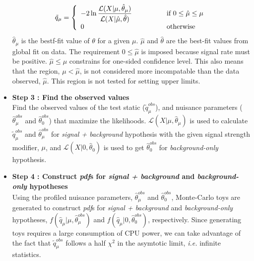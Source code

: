 \begin{itemize}
\begin{eqnarray} 
\tilde{q}_\mu 
= 
\left\{ \begin{array}{l l}
\displaystyle
-2 \ln \frac{\mathcal{L} ( X | \mu, \hat{\theta}_\mu)}
            {\mathcal{L} ( X | \hat{\mu}, \hat{\theta})}  
            & \quad \quad \quad \quad \textrm{if } 0 \le \hat{\mu} \le \mu \\
0           & \quad \quad \quad \quad \textrm{otherwise}
\end{array} \right.
\end{eqnarray}  
$\hat{\theta}_\mu$ is the bestf-fit value of $\theta$ for a given $\mu$. 
$\hat{\mu}$ and $\hat{\theta}$ are the best-fit values from global fit on data. 
The requirement $0 \le \hat{\mu}$ is imposed because signal rate must be positive. 
$\hat{\mu} \le \mu$ constrains for one-sided confidence level. 
This also means that the region, $\mu < \hat{\mu}$, is not considered  
more incompatable than the data observed, $\hat{\mu}$. This region 
is not tested for setting upper limits.
%
\item{\textbf{Step 3 : Find the observed values}}  \\
Find the observed values of the test static ($\tilde{q}_\mu^{obs}$), and 
nuisance parameters ($\hat{\theta}_\mu^{obs}$ and $\hat{\theta}_0^{obs}$)
that maximize the likelihoods. 
$\mathcal{L} ( X | \mu, \hat{\theta}_\mu)$ is used to calculate
$\tilde{q}_\mu^{obs}$ and $\hat{\theta}_\mu^{obs}$ for \textit{signal + background}
hypothesis with the given signal strength modifier, $\mu$,
and $\mathcal{L} ( X | 0, \hat{\theta}_0)$ is used to get $\hat{\theta}_0^{obs}$
for \textit{background-only} hypothesis.    
%
\item{\textbf{Step 4 : Construct \textit{pdf}s for \textit{signal + background} 
       and \textit{background-only} hypotheses} } \\
Using the profiled nuisance parameters, $\hat{\theta}_\mu^{obs}$ and $\hat{\theta}_0^{obs}$, 
Monte-Carlo toys are generated to construct \textit{pdf}s for \textit{signal + background}
and \textit{background-only} hypotheses, 
$f\left( \hat{q}_\mu | \mu, \hat{\theta}_\mu^{obs} \right)$ and 
$f\left( \hat{q}_\mu | 0, \hat{\theta}_0^{obs} \right)$, respectively.
Since generating toys requires a large consumption of CPU power, 
we can take advantage of the fact that $\tilde{q}_\mu^{obs}$ follows 
a half $\chi^2$ in the asymtotic limit, \textit{i.e.} infinite statistics.

\end{itemize}
